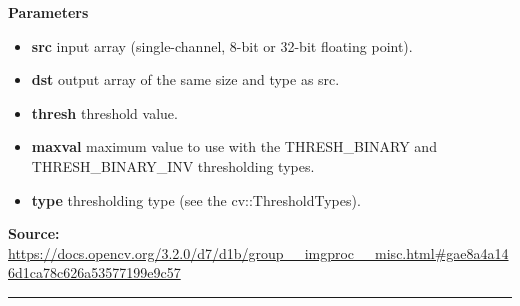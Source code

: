 \textbf{Parameters}
\begin{itemize}
    \item \textbf{src} input array (single-channel, 8-bit or 32-bit floating point).
    \item \textbf{dst} output array of the same size and type as src.
    \item \textbf{thresh} threshold value.
    \item \textbf{maxval} maximum value to use with the THRESH\_BINARY and THRESH\_BINARY\_INV thresholding types.
    \item \textbf{type}	thresholding type (see the cv::ThresholdTypes).
\end{itemize}
   
\textbf{Source:} \url{https://docs.opencv.org/3.2.0/d7/d1b/group__imgproc__misc.html#gae8a4a146d1ca78c626a53577199e9c57}

\noindent\rule{\textwidth}{0.5pt}


